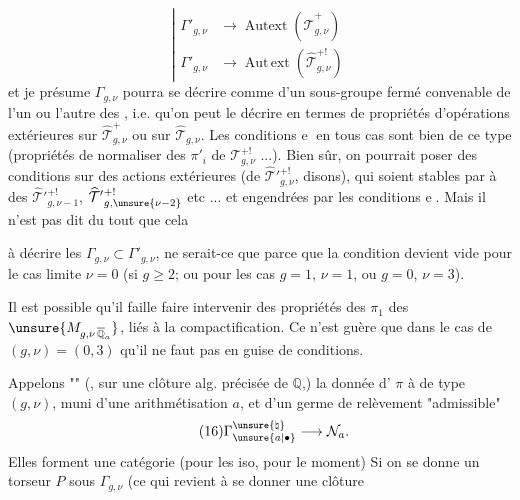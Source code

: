 \[
\tag{15}
\left|
\begin{aligned}
\Gamma'_{g,\nu}&\longrightarrow\operatorname{Autext}(\widehat{\mathcal T}_{g,\nu}^{+})\\
\Gamma'_{g,\nu}&\longrightarrow\operatorname{Aut\,ext}(\widehat{\mathcal T}_{g,\nu}^{+!})
\end{aligned}
\right.
\]
et je présume  $\Gamma_{g,\nu}$ pourra
se décrire comme  d'un
sous-groupe fermé convenable de l'un
ou l'autre des  , i.e. qu'on
peut le décrire en termes de propriétés
d'opérations extérieures sur $\widehat{\mathcal T}_{g,\nu}^{+}$ ou
sur $\widehat{\mathcal T}_{g,\nu}$. Les conditions \textcircled{e} en tous
cas sont bien de ce type (propriétés
de normaliser des  
 $\pi'_i$ de $\mathcal T_{g,\nu}^{+!}$ ...).
Bien sûr, on
pourrait poser des conditions sur des
actions extérieures (de $\widehat{\mathcal T}'{}_{g,\nu}^{+!}$, disons),
qui soient stables par   à des
$\widehat{\mathcal T}'{}_{g,\nu-1}^{+!}$, $\widehat{\mathcal T}'{}_{g,\unsure{\nu-2}}^{+!}$ etc ... et
engendrées par les conditions \textcircled{e}. Mais
il n'est pas dit du tout que cela



 à décrire les 
$\Gamma_{g,\nu}\subset\Gamma'_{g,\nu}$,
ne serait-ce que parce que la condition
devient vide pour  le cas limite $\nu=0$
(si $g\geq2$; ou pour les cas $g=1$, $\nu=1$, ou $g=0$, $\nu=3$).

Il est possible qu'il faille faire
intervenir des propriétés des $\pi_1$ des
$\unsure{M_{g,\nu\,\overline{\mathbb Q}_a}}$, liés à la compactification.
Ce n'est guère que dans le cas de
$(g,\nu)=(0,3)$ qu'il ne faut pas 
 en guise de conditions.

Appelons ""
(, sur une clôture alg.  précisée de $\mathbb Q$,)
la donnée d' 
$\pi$ à  
de type $(g,\nu)$, muni d'une arithmétisation
$a$, et d'un germe de relèvement
"admissible"
\[
\tag{16}
\Gamma_{\unsure{a|\bullet}}^{\unsure{\natural}}
\longrightarrow\mathcal N_a.
\]
Elles forment une catégorie (pour les
iso, pour le moment) Si on se
donne un torseur $P$ sous $\Gamma_{g,\nu}$
(ce qui  revient à se donner une clôture

